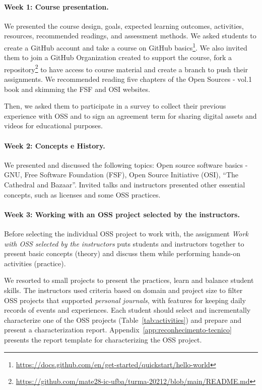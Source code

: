 \documentclass[sigconf]{acmart}
\begin{document}
\paragraph{\textbf{Week 1: Course presentation.}}

We presented the course design, goals, expected learning outcomes, activities, resources, recommended readings, and assessment methods.
We asked students to create a GitHub account and take a course on GitHub basics\footnote{\url{https://docs.github.com/en/get-started/quickstart/hello-world}}. 
We also invited them to join a GitHub Organization created to support the course, fork a repository\footnote{\url{https://github.com/mate28-ic-ufba/turma-20212/blob/main/README.md}} to have access to course material and create a branch to push their assignments.
We recommended reading five chapters of the Open Sources - vol.1 book and skimming the FSF and OSI websites.

Then, we asked them to participate in a survey to collect their previous experience with OSS and to sign an agreement term for sharing digital assets and videos for educational purposes.

\paragraph{\textbf{Week 2: Concepts e History.}}

We presented and discussed the following topics:
Open source software basics - GNU, Free Software Foundation (FSF), Open Source Initiative (OSI), ``The Cathedral and Bazaar''. 
%
Invited talks and instructors presented other essential concepts, such as licenses and some OSS practices.

\paragraph{\textbf{Week 3: Working with an OSS project selected by the instructors.}}

Before selecting the individual OSS project to work with, 
the assignment \textit{Work with OSS selected by the instructors} puts students and instructors together to present basic concepts (theory) and discuss them while performing hands-on activities (practice). 

We resorted to small projects to present the practices, learn and balance student skills.
The instructors used criteria based on domain and project size to filter OSS projects that supported  \textit{personal journals}, with features for keeping daily records of events and experiences. Each student should select and incrementally characterize one of the OSS projects (Table~\ref{tab:activities}) and prepare and present a characterization report. Appendix~\ref{app:reconhecimento-tecnico} presents the report template for characterizing the OSS project. 
\end{document}
